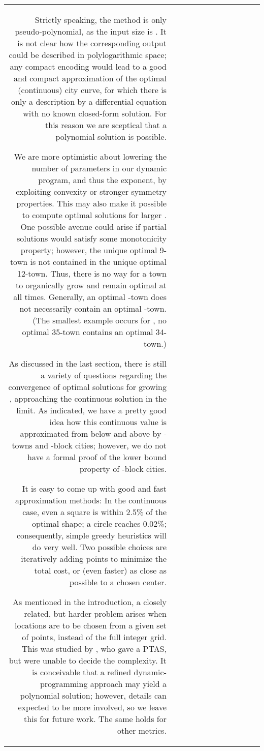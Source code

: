 \documentclass[preprint,authoryear,12pt]{elsarticle}
\begin{document}
\begin{table}
{\begin{tabular}{|r|rr|rr|r||r|rr|rr|r|}
{Strictly speaking, the method is only pseudo-polynomial, as
the input size is . It is not clear how
the corresponding output could be described in polylogarithmic
space; any compact encoding would
lead to
 a good and compact
approximation of the optimal (continuous) city curve, for which there is
only a description by a differential equation with no known closed-form solution.
For this reason we are sceptical that a polynomial solution
is possible.



We are more optimistic about lowering the number of parameters
in our dynamic program, and thus the exponent, by exploiting
convexity or
stronger symmetry properties. This may also make it possible to compute
optimal solutions for larger .
One possible avenue could arise if partial solutions
would satisfy some monotonicity property; however,
the unique optimal 9-town is not contained in the unique optimal 12-town.
Thus, there is no way for a town to organically grow
and remain optimal at all times.
Generally,
an optimal -town does not necessarily contain an optimal
 -town.
(The smallest example occurs for ,
no optimal 35-town contains an optimal 34-town.)

As discussed in the last section, there is still a variety of questions
regarding the convergence of optimal solutions for growing ,
approaching the continuous solution in the limit.
As indicated, we have a pretty good idea how this continuous value is
approximated from below and above by -towns and -block cities;
however, we do not have a formal proof of the lower bound property
of -block cities.

It is easy to come up with good and fast approximation methods:
In the continuous case, even a square is within 2.5\% of the optimal
shape; a circle reaches 0.02\%; consequently, simple greedy heuristics
will do very well. Two possible choices are iteratively adding points
to minimize the total cost, or (even faster) as close as possible to
a chosen center.

As mentioned in the introduction, a closely related, but harder
problem arises when  locations are to be chosen from a given set of
 points, instead of the full integer grid. This was studied by \cite{bender08},
who gave a PTAS, but were unable to decide the complexity.
It is conceivable that a refined dynamic-programming approach may
yield a polynomial solution; however, details can expected
to be more involved, so we leave this for future work.
The same holds for other metrics.

}
\end{tabular}}
\end{table}
\end{document}
